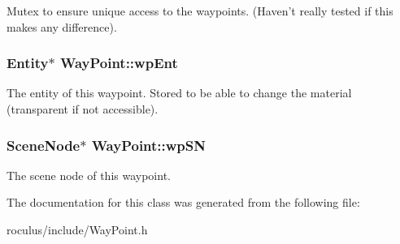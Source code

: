 \-Mutex to ensure unique access to the waypoints. (\-Haven't really tested if this makes any difference). \hypertarget{classWayPoint_a604e3fa32b79b6e2c9fabcf321f7c774}{
\subsubsection[{wp\-Ent}]{\setlength{\rightskip}{0pt plus 5cm}\-Entity$\ast$ {\bf \-Way\-Point\-::wp\-Ent}}}\label{classWayPoint_a604e3fa32b79b6e2c9fabcf321f7c774}
\-The entity of this waypoint. \-Stored to be able to change the material (transparent if not accessible). \hypertarget{classWayPoint_aeb4358a9171b219b8f0281cf84b5b6e0}{
\subsubsection[{wp\-S\-N}]{\setlength{\rightskip}{0pt plus 5cm}\-Scene\-Node$\ast$ {\bf \-Way\-Point\-::wp\-S\-N}}}\label{classWayPoint_aeb4358a9171b219b8f0281cf84b5b6e0}
\-The scene node of this waypoint. 

\-The documentation for this class was generated from the following file\-:\begin{DoxyCompactItemize}
\item 
roculus/include/\-Way\-Point.\-h\end{DoxyCompactItemize}
